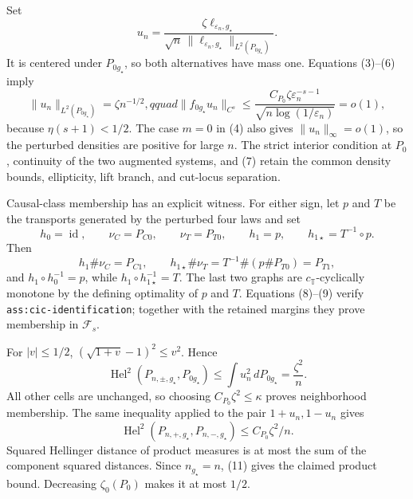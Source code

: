 Set
\[
 u_n=\frac{\zeta\ell_{\varepsilon_n,g_\star}}
 {\sqrt n\,\|\ell_{\varepsilon_n,g_\star}\|_{L^2(P_{0g_\star})}}. \tag{6}
\]
It is centered under \(P_{0g_\star}\), so both alternatives have mass one.  Equations (3)--(6) imply
\[
 \|u_n\|_{L^2(P_{0g_\star})}=\zeta n^{-1/2},qquad
 \|f_{0g_\star}u_n\|_{C^s}
 \leq\frac{C_{P_0}\zeta\varepsilon_n^{-s-1}}
 {\sqrt{n\log(1/\varepsilon_n)}}=o(1),                                \tag{7}
\]
because \(\eta(s+1)<1/2\).  The case \(m=0\) in (4) also gives \(\|u_n\|_\infty=o(1)\), so the perturbed densities are positive for large \(n\).  The strict interior condition at \(P_0\), continuity of the two augmented systems, and (7) retain the common density bounds, ellipticity, lift branch, and cut-locus separation.

Causal-class membership has an explicit witness.  For either sign, let \(p\) and \(T\) be the transports generated by the perturbed four laws and set
\[
 h_0=\operatorname{id},\qquad \nu_C=P_{C0},\qquad \nu_T=P_{T0},
 \qquad h_1=p,\qquad h_{1\star}=T^{-1}\circ p.                        \tag{8}
\]
Then
\[
 h_1\#\nu_C=P_{C1},\qquad
 h_{1\star}\#\nu_T=T^{-1}\#(p\#P_{T0})=P_{T1},                      \tag{9}
\]
and \(h_1\circ h_0^{-1}=p\), while
\(h_1\circ h_{1\star}^{-1}=T\).  The last two graphs are
\(c_{\mathbb T}\)-cyclically monotone by the defining optimality of \(p\) and \(T\).  Equations (8)--(9) verify \texttt{ass:cic-identification}; together with the retained margins they prove membership in \(\mathcal F_s\).

For \(|v|\leq1/2\), \((\sqrt{1+v}-1)^2\leq v^2\).  Hence
\[
 \operatorname{Hel}^2(P_{n,\pm,g_\star},P_{0g_\star})
 \leq\int u_n^2\,dP_{0g_\star}=\frac{\zeta^2}{n}.                   \tag{10}
\]
All other cells are unchanged, so choosing \(C_{P_0}\zeta^2\leq\kappa\) proves neighborhood membership.  The same inequality applied to the pair \(1+u_n,1-u_n\) gives
\[
 \operatorname{Hel}^2(P_{n,+,g_\star},P_{n,-,g_\star})
 \leq C_{P_0}\zeta^2/n.                                               \tag{11}
\]
Squared Hellinger distance of product measures is at most the sum of the component squared distances.  Since \(n_{g_\star}=n\), (11) gives the claimed product bound.  Decreasing \(\zeta_0(P_0)\) makes it at most \(1/2\).

